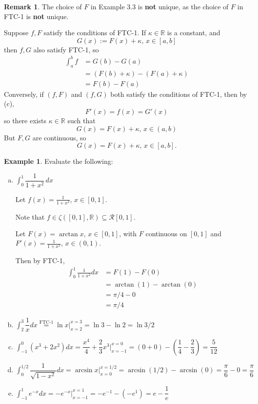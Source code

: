\documentclass[11pt]{article}
\theoremstyle{definition}
\newtheorem{exmp}[thm]{Example}
\newtheorem{remark}[thm]{Remark}
\newcommand{\mbR}{\ensuremath{\mathbb{R}}}
\begin{document}
\begin{remark}
The choice of $F$ in Example 3.3 is \textbf{not} unique, as the choice of $F$ in FTC-1 is \textbf{not} unique. 

Suppose $f, F$ satisfy the conditions of FTC-1. 
If $\kappa \in \mbR$ is a constant, and
$$G(x) := F(x) + \kappa, \hspace{2pt} x \in [a, b]$$
then $f, G$ also satisfy FTC-1, so
\begin{align*}
\int_a^b f & = G(b) - G(a) \\
& = \left(F(b) + \kappa\right) - \left(F(a) + \kappa\right) \\
& = F(b) - F(a) 
\end{align*}
Conversely, if $(f, F)$ and $(f, G)$ both satisfy the conditions of FTC-1, then by (c), 
$$F'(x) = f(x) = G'(x)$$
so there exists $\kappa \in \mbR$ such that
$$G(x) = F(x) + \kappa, \hspace{2pt} x \in (a, b)$$
But $F, G$ are continuous, so
$$G(x) = F(x) + \kappa, \hspace{2pt} x \in [a, b]\text{.}$$
\end{remark}

\begin{exmp} 
Evaluate the following:
\begin{enumerate}[(a)]

\item $\displaystyle\int_0^1 \dfrac{1}{1+x^2}\,dx$ 

Let $f(x) = \frac{1}{1+x^2}$, $x \in [0, 1]$. 

Note that $f \in \zeta([0, 1], \mbR) \subseteq \mathcal{R}[0, 1]$. 

Let $F(x) = \arctan x$, $x \in [0, 1]$, with $F$ continuous on $[0, 1]$ and $F'(x) = \frac{1}{1+x^2}$, $x \in (0, 1)$. 

Then by FTC-1,
\begin{align*}
\int_0^1 \frac{1}{1+x^2}dx & = F(1) - F(0) \\
& = \arctan(1) - \arctan(0) \\
& = \pi / 4 - 0 \\
& = \pi / 4
\end{align*}

\item $\displaystyle\int_2^3 \dfrac{1}{x}dx \stackrel{\text{FTC-1}}{=} \ln x \Big|_{x=2}^{x=3} = \ln 3 - \ln 2 = \ln 3/2$

\item $\displaystyle\int_{-1}^0 (x^3 + 2x^2)dx = \dfrac{x^4}{4} + \dfrac{2}{3}x^3 \Big|_{x=-1}^{x=0} = (0+0) - \left(\dfrac14 - \dfrac23\right) = \dfrac{5}{12}$

\item $\displaystyle\int_{0}^{1/2} \dfrac{1}{\sqrt{1-x^2}}dx = \arcsin x \Big|_{x=0}^{x=1/2} = \arcsin(1/2) - \arcsin(0) = \dfrac{\pi}6 - 0 = \dfrac{\pi}6$

\item $\displaystyle\int_{-1}^1 e^{-x}dx = -e^{-x} \Big|_{x=-1}^{x=1} = -e^{-1} - (-e^1) = e - \dfrac1e$
\end{enumerate}
\end{exmp}
\end{document}
